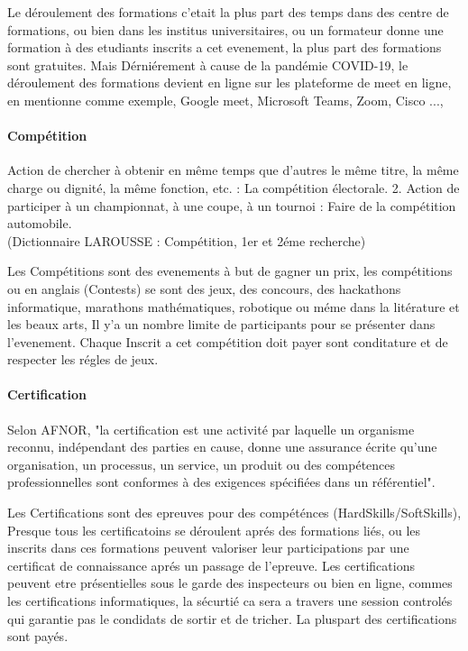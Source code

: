 \documentclass[12pt]{report}
\begin{document}
Le déroulement des formations c'etait la plus part des temps dans des centre de formations, ou bien dans les institus universitaires, ou un formateur donne une formation à des etudiants inscrits a cet evenement, la plus part des formations sont gratuites. Mais Dérniérement à cause de la pandémie COVID-19, le déroulement des formations devient en ligne sur les plateforme de meet en ligne, en mentionne comme exemple, Google meet, Microsoft Teams, Zoom, Cisco ..., 

\paragraph{Compétition}

 Action de chercher à obtenir en même temps que d'autres le même titre, la même charge ou dignité, la même fonction, etc. : La compétition électorale. 2. Action de participer à un championnat, à une coupe, à un tournoi : Faire de la compétition automobile.
\\(Dictionnaire LAROUSSE : Compétition, 1er et 2éme recherche)

Les Compétitions sont des evenements à but de gagner un prix, les compétitions ou en anglais (Contests) se sont des jeux, des concours, des hackathons informatique, marathons mathématiques, robotique ou méme dans la litérature et les beaux arts, Il y'a un nombre limite de participants pour se présenter dans l'evenement. Chaque Inscrit a cet compétition doit payer sont conditature et de respecter les régles de jeux. 

\paragraph{Certification}

Selon AFNOR, "la certification est une activité par laquelle un organisme reconnu, indépendant des parties en cause, donne une assurance écrite qu'une organisation, un processus, un service, un produit ou des compétences professionnelles sont conformes à des exigences spécifiées dans un référentiel"\cite{22}.

Les Certifications sont des epreuves pour des compéténces (HardSkills/SoftSkills), Presque tous les certificatoins se déroulent aprés des formations liés, ou les inscrits dans ces formations peuvent valoriser leur participations par une certificat de connaissance aprés un passage de l'epreuve. 
Les certifications peuvent etre présentielles sous le garde des inspecteurs ou bien en ligne, commes les certifications informatiques, la sécurtié ca sera a travers une session controlés qui garantie pas le condidats de sortir et de tricher.
La pluspart des certifications sont payés.
\end{document}
